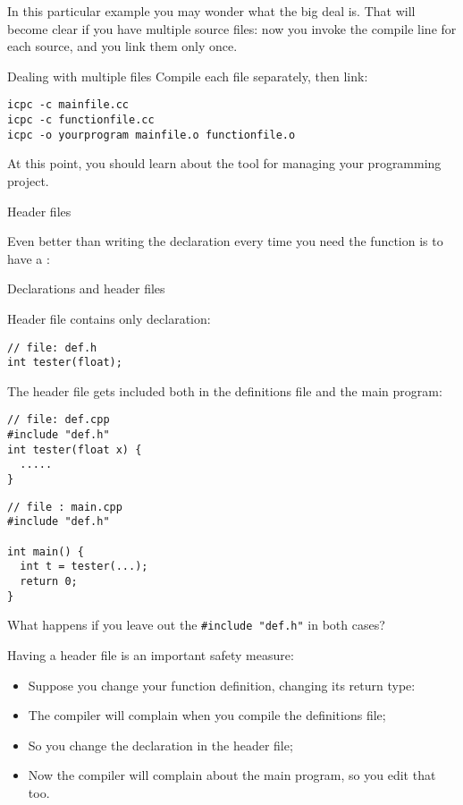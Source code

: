 In this particular example you may wonder what the big deal is.
That will become clear if you have multiple source files: now you
invoke the compile line for each source, and you link them only once.

\begin{block}{Dealing with multiple files}
  \label{sl:link-multiple}
  Compile each file separately, then link:
\begin{verbatim}
icpc -c mainfile.cc
icpc -c functionfile.cc
icpc -o yourprogram mainfile.o functionfile.o
\end{verbatim}  
\end{block}

At this point, you should learn about the  tool for
managing your programming project.

 {Header files}
\label{sec:headerfile}
\label{sec:hfile}

Even better than writing the declaration every time you need the
function is to have a :

\begin{block}{Declarations and header files}
  \label{sl:proto-header}
  \begin{multicols}{2}
    Header file contains only declaration:
    \columnbreak
\begin{lstlisting}
// file: def.h
int tester(float);
\end{lstlisting}
\end{multicols}

The header file gets included both in the definitions file and the
main program:
\begin{multicols}{2}  
\begin{lstlisting}
// file: def.cpp
#include "def.h"
int tester(float x) {
  .....
}
\end{lstlisting}
\vfill\columnbreak
\begin{lstlisting}
// file : main.cpp
#include "def.h"

int main() {
  int t = tester(...);
  return 0;
}
\end{lstlisting}
\end{multicols}
What happens if you leave out the \lstinline$#include "def.h"$ in both cases?
\end{block}

Having a header file is an important safety measure:
\begin{itemize}
\item Suppose you change your function definition, changing its return
  type:
\item The compiler will complain when you compile the definitions
  file;
\item So you change the declaration in the header file;
\item Now the compiler will complain about the main program, so you
  edit that too.
\end{itemize}

